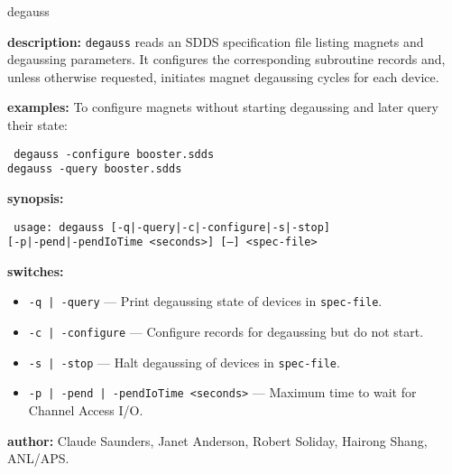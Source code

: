 \begin{sddsprog}{degauss}
\item \textbf{description:}
\verb+degauss+ reads an SDDS specification file listing magnets and degaussing parameters.
It configures the corresponding subroutine records and, unless otherwise requested, initiates
magnet degaussing cycles for each device.
\item \textbf{examples:}
To configure magnets without starting degaussing and later query their state:
\begin{flushleft}{\tt
  degauss -configure booster.sdds\\
  degauss -query booster.sdds
}\end{flushleft}
\item \textbf{synopsis:}
  \begin{flushleft}{\tt
    usage: degauss [-q|-query|-c|-configure|-s|-stop]\\
    \phantom{degauss }[-p|-pend|-pendIoTime <seconds>] [--] <spec-file>
  }\end{flushleft}
\item \textbf{switches:}
\begin{itemize}
  \item {\tt -q\,|\,-query} --- Print degaussing state of devices in {\tt spec-file}.
  \item {\tt -c\,|\,-configure} --- Configure records for degaussing but do not start.
  \item {\tt -s\,|\,-stop} --- Halt degaussing of devices in {\tt spec-file}.
  \item {\tt -p\,|\,-pend\,|\,-pendIoTime <seconds>} --- Maximum time to wait for Channel Access I/O.
\end{itemize}
\item \textbf{author:} Claude Saunders, Janet Anderson, Robert Soliday, Hairong Shang, ANL/APS.
\end{sddsprog}
